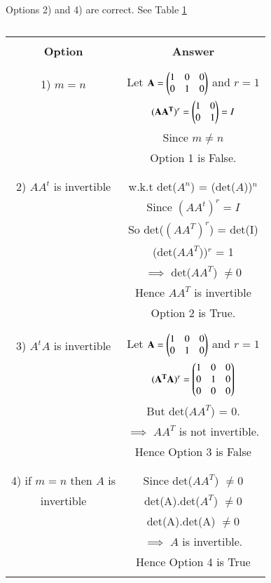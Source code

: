 Options 2) and 4) are correct.  See Table \ref{eq:solutions/2017/june/72/table}
\begin{table}[!ht]
\begin{center}
\begin{tabular}{|c|c|}
\hline
& \\
\textbf{Option} & \textbf{Answer}\\
& \\
\hline
& \\
1) $m=n$ & Let $\mathbf{A} = \begin{pmatrix}1 & 0 & 0\\0 & 1 & 0\end{pmatrix}$ and $r = 1$\\
& $(\mathbf{AA^T})^r = \begin{pmatrix}1 & 0\\0 & 1\end{pmatrix} = I$\\
& Since $m \neq n$\\
& Option 1 is False.\\
& \\ 
\hline
& \\
2) $AA^t$ is invertible & w.k.t det($A^n$) = (det($A$))$^n$\\
 & Since $(AA^t)^r = I$\\
& So det($(AA^T)^r$) = det(I)\\
& (det($AA^T$))$^r$ = 1\\
& $\implies$ det($AA^T$) $\neq 0$\\
& Hence $AA^T$ is invertible\\
& Option 2 is True.\\
& \\
\hline
& \\
3) $A^tA$ is invertible & Let $\mathbf{A} = \begin{pmatrix}1 & 0 & 0\\0 & 1 & 0\end{pmatrix}$ and $r = 1$\\
 & $(\mathbf{A^TA})^r = \begin{pmatrix}1 & 0 & 0\\0 & 1 & 0\\0 & 0 & 0\end{pmatrix}$\\
& But det($AA^T$) = 0.\\
& $\implies$ $AA^T$ is not invertible.\\
& Hence Option 3 is False\\
& \\
\hline
& \\
4) if $m=n$ then $A$ is & Since det($AA^T$) $\neq 0$\\
invertible & det(A).det($A^T$) $\neq 0$\\
 & det(A).det(A) $\neq 0$\\
& $\implies$ $A$ is invertible.\\
& Hence Option 4 is True\\
& \\
\hline
\end{tabular}
\end{center}
\caption{}
\label{eq:solutions/2017/june/72/table}
\end{table}
